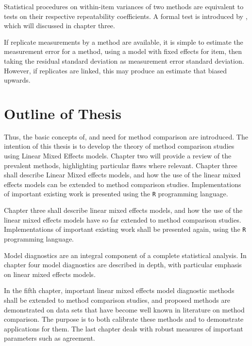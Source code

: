 \documentclass[12pt, a4paper]{report}
\theoremstyle{plain}
\theoremstyle{definition}
\theoremstyle{remark}
\begin{document}
	
		
Statistical procedures on within-item variances of two methods are equivalent to tests on their respective repeatability coefficients. A formal test is introduced by \citet{ARoy2009}, which will discussed in chapter three.
		
	
	If replicate measurements by a method are available, it is simple to estimate the measurement error for a method, using a model with fixed effects for item, then taking the residual standard deviation as measurement error standard deviation. However, if replicates are linked, this may produce an estimate that biased upwards.
	

	

	\section{Outline of Thesis}
	Thus, the basic concepts of, and need for method comparison are introduced. The intention of this thesis is to develop the theory of method comparison studies using Linear Mixed Effects models. Chapter two will provide a review of the prevalent methods, highlighting particular flaws where relevant. Chapter three shall describe Linear Mixed effects models, and how the use of the linear mixed
	effects models can be extended to method comparison studies. Implementations of important existing work is presented using the \texttt{R} programming language.
	
		
	Chapter three shall describe linear mixed effects models, and how the use of the linear mixed effects models have so far extended to method comparison studies. Implementations of important existing work shall be presented again, using the \texttt{R} programming language.
	
	Model diagnostics are an integral component of a complete statistical analysis.
	In chapter four model diagnostics are described in depth, with particular
	emphasis on linear mixed effects models.
	
	In the fifth chapter, important linear mixed effects model diagnostic methods shall be extended to method comparison studies, and proposed methods are demonstrated on data sets that have become well known in literature on method comparison. The purpose is to both calibrate these methods and to demonstrate applications for them.
	The last chapter deals with robust measures of important parameters such as agreement.
	
	
	
\end{document}
